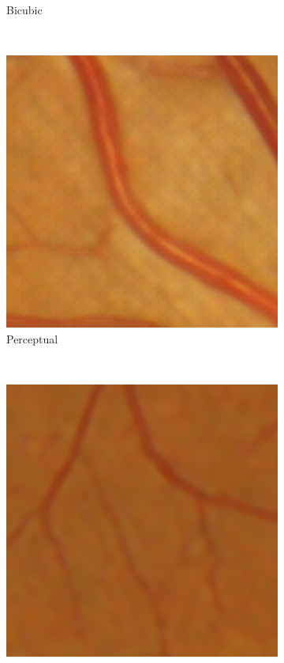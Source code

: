 \documentclass{scrartcl}
\begin{document}
\begin{figure}[htb]
{\begin{subfigure}{0.2\textwidth}
    \caption{Bicubic}
\end{subfigure}~
\begin{subfigure}{0.2\textwidth}
\centering
    \includegraphics[width=1.0\textwidth]{patch_sr1_sal_perc_small}
    \caption{Perceptual}
\end{subfigure}~
\begin{subfigure}{0.2\textwidth}
\centering
    \includegraphics[width=1.0\textwidth]{patch_sr1_sal_small}

\end{subfigure}}
\end{figure}
\end{document}
